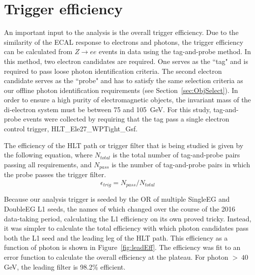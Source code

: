 
\section{Trigger efficiency}
\label{sec:trigEff}
An important input to the analysis is the overall trigger efficiency. Due to the similarity of the ECAL response 
to electrons and photons, the trigger efficiency can be calculated from 
$Z\rightarrow ee$ events in data using the tag-and-probe method. In this method, two electron candidates
are required. One serves as the ``tag" and is required to pass loose photon identification criteria. 
The second electron candidate serves
as the ``probe" and has to satisfy the same selection criteria as our offline photon identification requirements (see Section~\ref{sec:ObjSelect}). 
In order to ensure a high purity of electromagnetic objects, the invariant mass of the di-electron system must be between 75 and 105~GeV. 
For this study, tag-and-probe events were collected by requiring that the tag pass
a single electron control trigger, HLT\_Ele27\_WPTight\_Gsf.


The efficiency of the HLT path or trigger filter that is being studied is given by the following equation, where $N_{total}$ is the total number of tag-and-probe pairs 
passing all requirements, and $N_{pass}$ is the number of tag-and-probe pairs in which  the probe passes the trigger filter.
\begin{equation}
 \epsilon_{trig} = N_{pass} / N_{total}
\end{equation}

Because our analysis trigger is seeded by the OR of multiple SingleEG and DoubleEG L1 seeds, the names of which changed over the course of the 2016 data-taking period, calculating the L1 efficiency on its own proved tricky. Instead, it was simpler to calculate the total efficiency with which photon candidates pass both the L1 seed and the leading leg of the HLT path. This efficiency as a function of photon \pt is shown in Figure~\ref{fig:leadEff}. The efficiency was fit to an error function to calculate the overall efficiency at the plateau. For photon \pt $>~40$ GeV, the leading filter is 98.2\% efficient.

